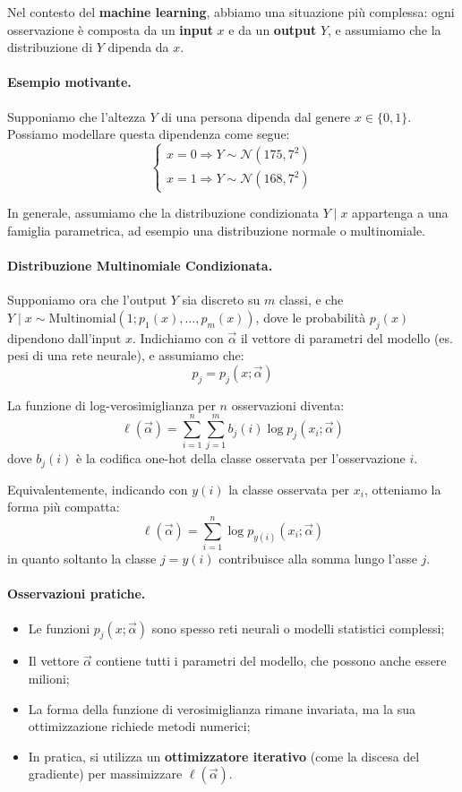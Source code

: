 Nel contesto del \textbf{machine learning}, abbiamo una situazione più complessa: ogni osservazione è composta da un \textbf{input} \( x \) e da un \textbf{output} \( Y \), e assumiamo che la distribuzione di \( Y \) dipenda da \( x \).

\paragraph{Esempio motivante.}
Supponiamo che l'altezza \( Y \) di una persona dipenda dal genere \( x \in \{0,1\} \). Possiamo modellare questa dipendenza come segue:
\[
\begin{cases}
x = 0 \Rightarrow Y \sim \mathcal{N}(175, 7^2) \\
x = 1 \Rightarrow Y \sim \mathcal{N}(168, 7^2)
\end{cases}
\]

In generale, assumiamo che la distribuzione condizionata \( Y \mid x \) appartenga a una famiglia parametrica, ad esempio una distribuzione normale o multinomiale.

\paragraph{Distribuzione Multinomiale Condizionata.}
Supponiamo ora che l’output \( Y \) sia discreto su \( m \) classi, e che \( Y \mid x \sim \mathrm{Multinomial}(1; p_1(x), \dots, p_m(x)) \), dove le probabilità \( p_j(x) \) dipendono dall’input \( x \). Indichiamo con \( \vec{\alpha} \) il vettore di parametri del modello (es. pesi di una rete neurale), e assumiamo che:
\[
p_j = p_j(x; \vec{\alpha})
\]

La funzione di log-verosimiglianza per \( n \) osservazioni diventa:
\[
\ell(\vec{\alpha}) = \sum_{i=1}^n \sum_{j=1}^m b_j(i) \log p_j(x_i; \vec{\alpha})
\]
dove \( b_j(i) \) è la codifica one-hot della classe osservata per l'osservazione \( i \).

Equivalentemente, indicando con \( y(i) \) la classe osservata per
\( x_i \), otteniamo la forma più compatta:
\[
\ell(\vec{\alpha}) = \sum_{i=1}^n \log p_{y(i)}(x_i; \vec{\alpha})
\]
in quanto soltanto la classe \( j = y(i) \) contribuisce alla somma lungo l'asse
\( j \).


\paragraph{Osservazioni pratiche.}
\begin{itemize}
  \item Le funzioni \( p_j(x; \vec{\alpha}) \) sono spesso reti neurali o modelli statistici complessi;
  \item Il vettore \( \vec{\alpha} \) contiene tutti i parametri del modello, che possono anche essere milioni;
  \item La forma della funzione di verosimiglianza rimane invariata, ma la sua ottimizzazione richiede metodi numerici;
  \item In pratica, si utilizza un \textbf{ottimizzatore iterativo} (come la discesa del gradiente) per massimizzare \( \ell(\vec{\alpha}) \).
\end{itemize}

